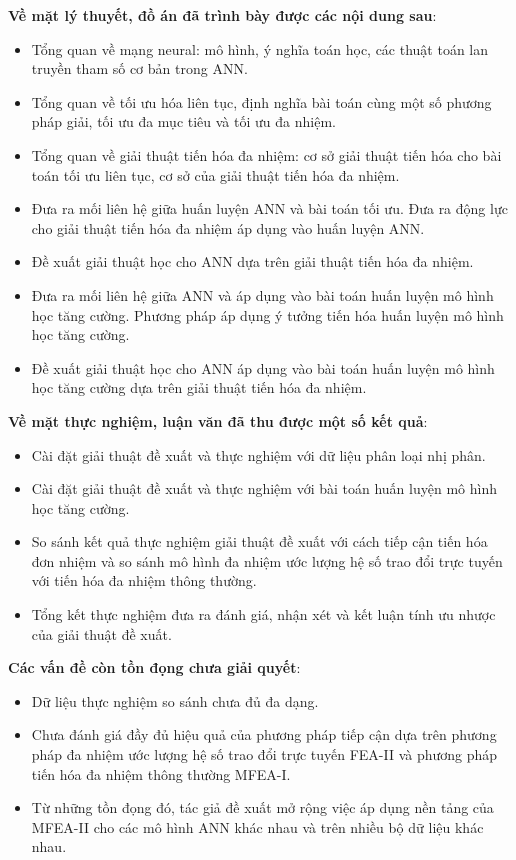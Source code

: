 \textbf{Về mặt lý thuyết, đồ án đã trình bày được các nội dung sau}:
\begin{itemize}
    \item Tổng quan về mạng neural: mô hình, ý nghĩa toán học, các thuật toán lan truyền tham số cơ bản trong ANN.
    \item Tổng quan về tối ưu hóa liên tục, định nghĩa bài toán cùng một số phương pháp giải, tối ưu đa mục tiêu và tối ưu đa nhiệm.
    \item  Tổng quan về giải thuật tiến hóa đa nhiệm: cơ sở giải thuật tiến hóa cho bài toán tối ưu liên tục, cơ sở của giải thuật tiến hóa đa nhiệm.
    \item Đưa ra mối liên hệ giữa huấn luyện ANN và bài toán tối ưu. Đưa ra động lực cho giải thuật tiến hóa đa nhiệm áp dụng vào huấn luyện ANN.
    \item Đề xuất giải thuật học cho ANN dựa trên giải thuật tiến hóa đa nhiệm.
    \item Đưa ra mối liên hệ giữa ANN và áp dụng vào bài toán huấn luyện mô hình học tăng cường. Phương pháp áp dụng ý tưởng tiến hóa huấn luyện mô hình học tăng cường.
    \item Đề xuất giải thuật học cho ANN áp dụng vào bài toán huấn luyện mô hình học tăng cường dựa trên giải thuật tiến hóa đa nhiệm.
\end{itemize}
\textbf{Về mặt thực nghiệm, luận văn đã thu được một số kết quả}:
\begin{itemize}
    \item Cài đặt giải thuật đề xuất và thực nghiệm với dữ liệu phân loại nhị phân.
    \item Cài đặt giải thuật đề xuất và thực nghiệm với bài toán huấn luyện mô hình học tăng cường.
    \item So sánh kết quả thực nghiệm giải thuật đề xuất với cách tiếp cận tiến hóa đơn nhiệm và so sánh mô hình đa nhiệm ước lượng hệ số trao đổi trực tuyến với tiến hóa đa nhiệm thông thường.
    \item Tổng kết thực nghiệm đưa ra đánh giá, nhận xét và kết luận tính ưu nhược của giải thuật đề xuất.
\end{itemize}
\textbf{Các vấn đề còn tồn đọng chưa giải quyết}:
\begin{itemize}
    \item Dữ liệu thực nghiệm so sánh chưa đủ đa dạng.
    \item Chưa đánh giá đầy đủ hiệu quả của phương pháp tiếp cận dựa trên phương pháp đa nhiệm ước lượng hệ số trao đổi trực tuyến FEA-II và phương pháp tiến hóa đa nhiệm thông thường MFEA-I.
    \item Từ những tồn đọng đó, tác giả đề xuất mở rộng việc áp dụng nền tảng của MFEA-II cho các mô hình ANN khác nhau và trên nhiều bộ dữ liệu khác nhau.
\end{itemize}

